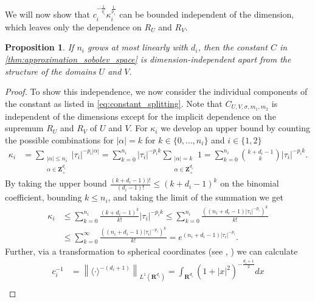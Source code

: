 \documentclass[a4paper]{article}
\newcommand{\rr}[1]{\mathbf{R}^{#1}}
\newcommand{\zzp}[1]{\mathbf{Z}_+^{#1}}
\newcommand{\eabs}[1]{\langle #1\rangle}     %
\newcommand{\abs}[1]{| #1|}     %
\newcommand{\normbig}[2]{\left\|#1\right\|_{#2}}
\numberwithin{equation}{section}
\newtheorem{proposition}[theorem]{Proposition}
\theoremstyle{remark}
\begin{document}
We will now show that $c_i^{-\frac{1}{q_i^\prime}}\kappa_i^{\frac{1}{p_1}}$
can be bounded independent of the dimension,
which leaves only the dependence on $R_U$ and $R_V$.

\begin{proposition}
\label{prop:breaking_curse_of_dim}
    If $n_i$ grows at most linearly with $d_i$,
    then the constant $C$ in \cref{thm:approximation_sobolev_space}
    is dimension-independent apart from the structure of the domains $U$ and $V$.
\end{proposition}
\begin{proof}
To show this independence,
we now consider the individual components of the constant as listed in \cref{eq:constant_splitting}.
Note that $C_{U,V,\sigma,m_1,m_2}$ 
is independent of the dimensions except for the
implicit dependence on the supremum $R_U$ and $R_V$ of $U$ and $V$.
For $\kappa_i$ we develop an upper bound by counting the
possible combinations for $\abs{\alpha}=k$ for $k\in\{0,\ldots,n_i\}$
and $i\in \{1, 2\}$
\begin{align*}
    \kappa_i&=
    \sum_{\substack{\abs{\alpha}\leq n_i
    \\
    \alpha\in \zzp{d_i}}}
            \abs{\tau_i}^{-p_i\abs{\alpha}}
    =
    \sum_{k=0}^{n_i}
        \abs{\tau_i}^{-p_ik}
    \sum_{\substack{\abs{\alpha}=k
    \\
    \alpha\in \zzp{d_i}}}
        1
    =
    \sum_{k=0}^{n_i}
        \binom{k+d_i-1}{k}
        \abs{\tau_i}^{-p_ik}.
\end{align*}
By taking the upper bound $\frac{(k+d_i-1))!}{(d_i-1)!}\leq (k+d_i-1)^k$
on the binomial coefficient, bounding $k\leq n_i$,
and taking the limit of the summation we get
\begin{align*}
    \kappa_i
    &\leq
    \sum_{k=0}^{n_i}
        \frac{(k+d_i-1)^k}{k!}
        \abs{\tau_i}^{-p_ik}
    \leq
    \sum_{k=0}^{n_i}
        \frac{((n_i+d_i-1)\abs{\tau_i}^{-p_i})^k}{k!}
        \\
    &\leq
    \sum_{k=0}^{\infty}
        \frac{((n_i+d_i-1)\abs{\tau_i}^{-p_i})^k}{k!}
    =e^{(n_i+d_i-1)\abs{\tau_i}^{-p_i}}.
\end{align*}
Further, via a transformation to spherical coordinates
(see \cite[(6.131) Examples (c)]{Stromberg15IntroductionClassicalReal}, \cite[Section 3]{Smith89HowSmallUnit})
we can calculate
\begin{align*}
    c_i^{-1}&=\normbig{\eabs{\cdot}^{-(d_i+1)}}{L^1(\rr{d_i})}
    =\int_{\rr{d_i}}(1+\abs{x}^2)^{-\frac{d_i+1}{2}}dx\\

\end{align*}
\end{proof}
\end{document}
